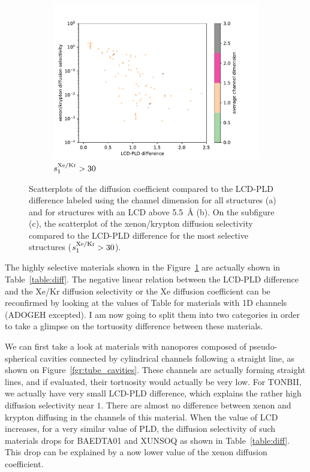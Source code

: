 \documentclass[main]{subfiles}
\begin{document}
\begin{figure}[ht]
\begin{subfigure}[b]{0.32\textwidth}
      \centering
      \includegraphics[width=\textwidth]{figures/5-diffusion/diff_D_xekr-poresize-chandim.pdf}
      \caption{$s^{\text{Xe/Kr}}_1>30$}\label{fgr:porediff_c}
  \end{subfigure}
     \caption{ Scatterplots of the diffusion coefficient compared to the LCD-PLD difference labeled using the channel dimension for all structures (a) and for structures with an LCD above \SI{5.5}{\angstrom} (b). On the subfigure (c), the scatterplot of the xenon/krypton diffusion selectivity compared to the LCD-PLD difference for the most selective structures ($s^{\text{Xe/Kr}}_1>30$). }\label{fgr:porediff}
\end{figure}

The highly selective materials shown in the Figure~\ref{fgr:porediff_c} are actually shown in Table~\ref{table:diff}. The negative linear relation between the LCD-PLD difference and the Xe/Kr diffusion selectivity or the Xe diffusion coefficient can be reconfirmed by looking at the values of Table for materials with 1D channels (ADOGEH excepted). I am now going to split them into two categories in order to take a glimpse on the tortuosity difference between these materials.  

We can first take a look at materials with nanopores composed of pseudo-spherical cavities connected by cylindrical channels following a straight line, as shown on Figure~\ref{fgr:tube_cavities}. These channels are actually forming straight lines, and if evaluated, their tortuosity would actually be very low. For TONBII, we actually have very small LCD-PLD difference, which explains the rather high diffusion selectivity near $1$. There are almost no difference between xenon and krypton diffusing in the channels of this material. When the value of LCD increases, for a very similar value of PLD, the diffusion selectivity of such materials drops for BAEDTA01 and XUNSOQ as shown in Table~\ref{table:diff}. This drop can be explained by a now lower value of the xenon diffusion coefficient. 
\end{document}
